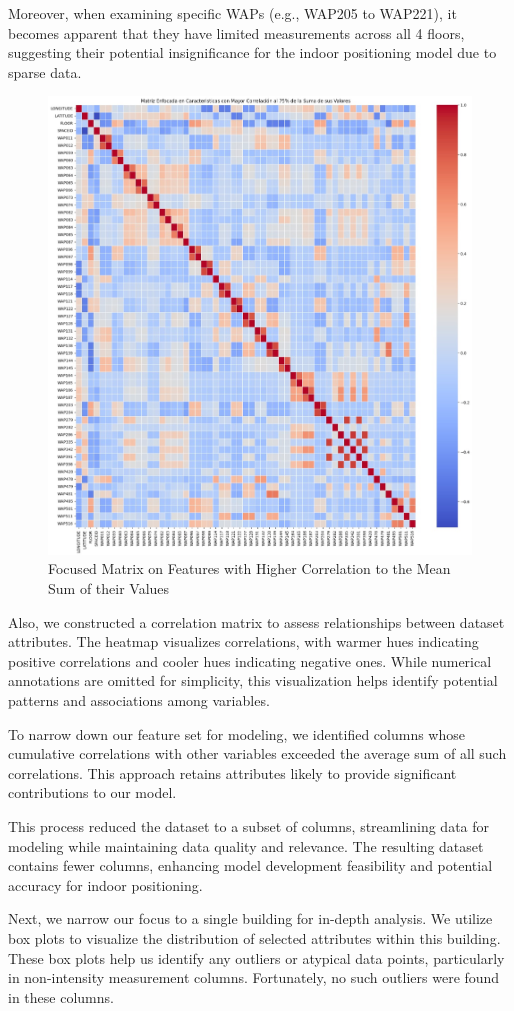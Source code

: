 \documentclass[conference]{IEEEtran}
\begin{document}
Moreover, when examining specific WAPs (e.g., WAP205 to WAP221), it becomes apparent that they have limited measurements across all 4 floors, suggesting their potential insignificance for the indoor positioning model due to sparse data.

\begin{figure}[h!]
    \centering
    \includegraphics[width=0.5\linewidth]{Images/Imagecorrelacion.jpeg}
    \caption{Focused Matrix on Features with Higher Correlation to the Mean Sum of their Values}
    \label{fig:enter-label}
\end{figure}



Also, we constructed a correlation matrix to assess relationships between dataset attributes. The heatmap visualizes correlations, with warmer hues indicating positive correlations and cooler hues indicating negative ones. While numerical annotations are omitted for simplicity, this visualization helps identify potential patterns and associations among variables.

To narrow down our feature set for modeling, we identified columns whose cumulative correlations with other variables exceeded the average sum of all such correlations. This approach retains attributes likely to provide significant contributions to our model.

This process reduced the dataset to a subset of columns, streamlining data for modeling while maintaining data quality and relevance. The resulting dataset contains fewer columns, enhancing model development feasibility and potential accuracy for indoor positioning.


Next, we narrow our focus to a single building for in-depth analysis. We utilize box plots to visualize the distribution of selected attributes within this building. These box plots help us identify any outliers or atypical data points, particularly in non-intensity measurement columns. Fortunately, no such outliers were found in these columns.
\end{document}

